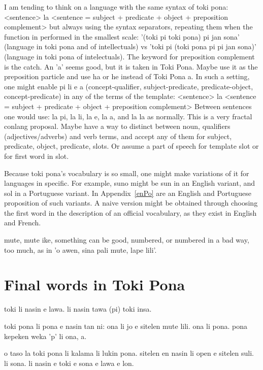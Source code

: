 \documentclass{article}
\begin{document}
I am tending to think on a language with the same syntax of toki pona:
<sentence> la <sentence = subject + predicate + object + preposition complement>
but always using the syntax separators,
repeating them when the function in performed in the smallest scale:
'(toki pi toki pona) pi jan sona' (language in toki pona and of intellectuals) vs
'toki pi (toki pona pi pi jan sona)' (language in toki pona of intelectuals).
The keyword for preposition complement is the catch.
An 'a' seems good, but it is taken in Toki Pona.
Maybe use it as the preposition particle and use ha or he
instead of Toki Pona a.
In such a setting,
one might enable pi li e a (concept-qualifier, subject-predicate,
predicate-object, concept-predicate)
in any of the terms of the template:
<sentence> la <sentence = subject + predicate + object + preposition complement>
Between sentences one would use:
la pi, la li, la e, la a, and la la as normally.
This is a very fractal conlang proposal.
Maybe have a way to distinct between noun, qualifiers (adjectives/adverbs) and verb terms,
and accept any of them for subject, predicate, object, predicate,
slots. Or assume a part of speech for template slot or for first word in slot.

Because toki pona's vocabulary is so small,
one might make variations of it for languages
in specific.
For example,
suno might be sun in an English variant,
and sol in a Portuguese variant.
In Appendix~\ref{enPo} are an English and Portuguese
proposition of such variants.
A naive version might be obtained through
choosing the first word in the description of
an official vocabulary, as they exist in English and French.



mute, mute ike,
something can be good, numbered,
or numbered in a bad way, too much,
as in 'o awen, sina pali mute, lape lili'.




% 


\section{Final words in Toki Pona}
toki li nasin e lawa.
li nasin tawa (pi) toki insa.

toki pona li pona e nasin tan ni:
ona li jo e sitelen mute lili.
ona li pona.
pona kepeken weka 'p' li ona, a.

o taso la toki pona li kalama li lukin pona.
sitelen en nasin li open e sitelen suli\cite{tpLang,pije,fb1,fb2,tokisona,Wikipesija}.
li sona. li nasin e toki e sona e lawa e lon.
\end{document}
